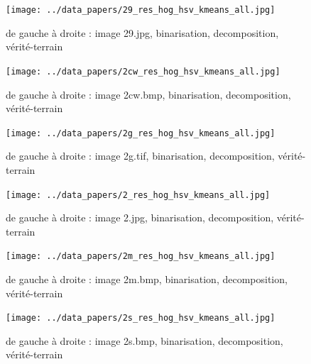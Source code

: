 \documentclass{book}
\begin{document}
\begin{figure}[H]
\begin{center}
\texttt{[image: ../data\_papers/29\_res\_hog\_hsv\_kmeans\_all.jpg]}
\end{center}
\caption{de gauche à droite : image 29.jpg, binarisation, decomposition, vérité-terrain}
\label{29}
\end{figure}
\clearpage


\begin{figure}[H]
\begin{center}
\texttt{[image: ../data\_papers/2cw\_res\_hog\_hsv\_kmeans\_all.jpg]}
\end{center}
\caption{de gauche à droite : image 2cw.bmp, binarisation, decomposition, vérité-terrain}
\label{2cw}
\end{figure}
\clearpage


\begin{figure}[H]
\begin{center}
\texttt{[image: ../data\_papers/2g\_res\_hog\_hsv\_kmeans\_all.jpg]}
\end{center}
\caption{de gauche à droite : image 2g.tif, binarisation, decomposition, vérité-terrain}
\label{2g}
\end{figure}
\clearpage


\begin{figure}[H]
\begin{center}
\texttt{[image: ../data\_papers/2\_res\_hog\_hsv\_kmeans\_all.jpg]}
\end{center}
\caption{de gauche à droite : image 2.jpg, binarisation, decomposition, vérité-terrain}
\label{2}
\end{figure}
\clearpage


\begin{figure}[H]
\begin{center}
\texttt{[image: ../data\_papers/2m\_res\_hog\_hsv\_kmeans\_all.jpg]}
\end{center}
\caption{de gauche à droite : image 2m.bmp, binarisation, decomposition, vérité-terrain}
\label{2m}
\end{figure}
\clearpage


\begin{figure}[H]
\begin{center}
\texttt{[image: ../data\_papers/2s\_res\_hog\_hsv\_kmeans\_all.jpg]}
\end{center}
\caption{de gauche à droite : image 2s.bmp, binarisation, decomposition, vérité-terrain}
\label{2s}
\end{figure}
\clearpage
\end{document}
